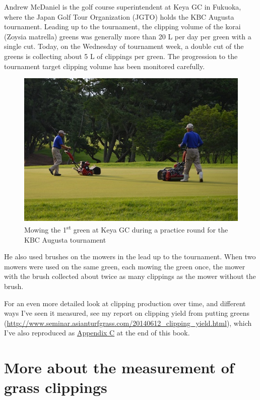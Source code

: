 \documentclass[12pt,b5,]{tufte-book}
\begin{document}
Andrew McDaniel is the golf course superintendent at Keya GC in Fukuoka, where the Japan Golf Tour Organization (JGTO) holds the KBC Augusta tournament. Leading up to the tournament, the clipping volume of the korai (Zoysia matrella) greens was generally more than 20 L per day per green with a single cut. Today, on the Wednesday of tournament week, a double cut of the greens is collecting about 5 L of clippings per green. The progression to the tournament target clipping volume has been monitored carefully.

\begin{figure}
\centering
\includegraphics{img/b1-4.png}
\caption{Mowing the 1\textsuperscript{st} green at Keya GC during a practice round for the KBC Augusta tournament}
\end{figure}

He also used brushes on the mowers in the lead up to the tournament. When two mowers were used on the same green, each mowing the green once, the mower with the brush collected about twice as many clippings as the mower without the brush.~

For an even more detailed look at clipping production over time, and different ways I've seen it measured, see my report on clipping yield from putting greens (\url{http://www.seminar.asianturfgrass.com/20140612_clipping_yield.html}), which I've also reproduced as \protect\hyperlink{report2014}{Appendix C} at the end of this book.

\hypertarget{more-about-the-measurement-of-grass-clippings}{%
\chapter{More about the measurement of grass clippings}\label{more-about-the-measurement-of-grass-clippings}}
\end{document}

